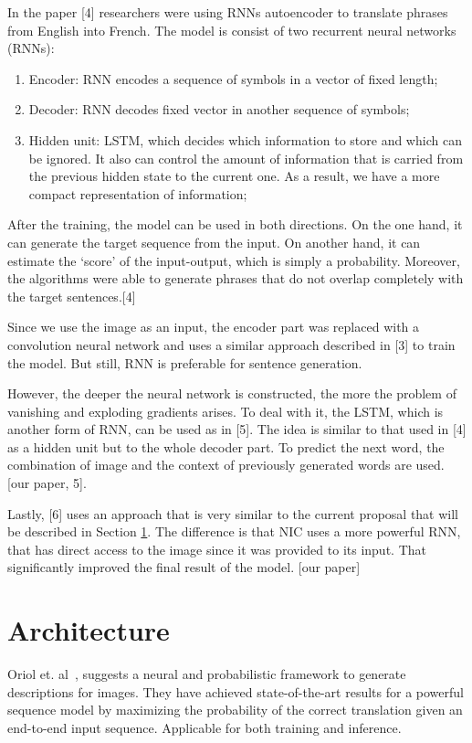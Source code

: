\documentclass[a4paper,UKenglish,cleveref, autoref, thm-restate]{lipics-v2021}
\begin{document}
In the paper [4] researchers were using RNNs autoencoder to translate phrases from English into French. The model is consist of two recurrent neural networks (RNNs):
 \begin{enumerate}
 \item Encoder: RNN encodes a sequence of symbols in a vector of fixed length;
 \item Decoder: RNN decodes fixed vector in another sequence of symbols;
 \item Hidden unit: LSTM, which decides which information to store and which can be ignored. It also can control the amount of information that is carried from the previous hidden state to the current one. As a result, we have a more compact representation of information;
 \end{enumerate}
After the training, the model can be used in both directions. On the one hand, it can generate the target sequence from the input. On another hand, it can estimate the ‘score’ of the input-output, which is simply a probability. Moreover, the algorithms were able to generate phrases that do not overlap completely with the target sentences.[4]

Since we use the image as an input, the encoder part was replaced with a convolution neural network and uses a similar approach described in [3] to train the model. But still, RNN is preferable for sentence generation.

However, the deeper the neural network is constructed, the more the problem of vanishing and exploding gradients arises. To deal with it, the LSTM, which is another form of RNN, can be used as in [5]. The idea is similar to that used in [4] as a hidden unit but to the whole decoder part. To predict the next word, the combination of image and the context of previously generated words are used. [our paper, 5].

Lastly, [6] uses an approach that is very similar to the current proposal that will be described in Section \ref{Architecture}. The difference is that NIC uses a more powerful RNN, that has direct access to the image since it was provided to its input. That significantly improved the final result of the model. [our paper]

\section{Architecture}
\label{Architecture}

Oriol et. al~\cite{NIC}, suggests a neural and probabilistic framework to generate descriptions for images. They have achieved state-of-the-art results for a powerful sequence model by maximizing the probability of the correct translation given an end-to-end input sequence. Applicable for both training and inference.
\end{document}
